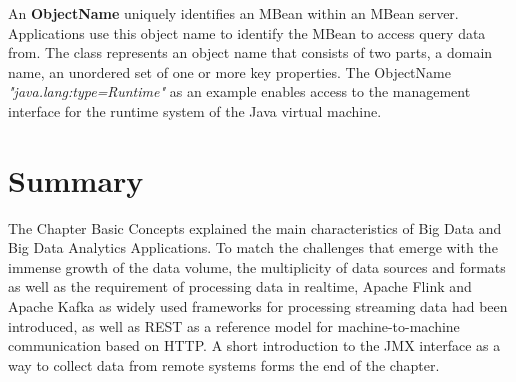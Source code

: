 An \textbf{ObjectName} uniquely identifies an MBean within an MBean server. Applications use this object name to identify
the MBean to access query data from. The class represents an object name that consists of two parts,
a domain name, an unordered set of one or more key properties. The ObjectName \textit{"java.lang:type=Runtime"}
as an example enables access to the management interface for the runtime system of the Java virtual machine.

\section{Summary}

The Chapter Basic Concepts explained the main characteristics of Big Data and Big Data Analytics Applications.
To match the challenges that emerge with the immense growth of the data volume, the multiplicity of data sources and
formats as well as the requirement of processing data in realtime, Apache Flink and Apache Kafka as widely used
frameworks for processing streaming data had been introduced, as well as REST as a reference model for machine-to-machine communication
based on HTTP.  A short introduction to the JMX interface as a way to collect data from remote systems forms the end of the chapter.
